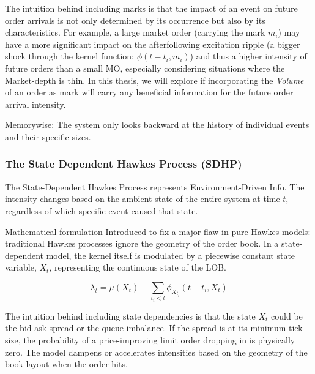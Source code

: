 \documentclass[12pt,a4paper]{cau_thesis}
\begin{document}
The intuition behind including marks is that the impact of an event
on future order arrivals is not only determined by its occurrence but
also by its characteristics. For example, a large market order
(carrying the mark $m_{i}$) may have a more significant impact on the
afterfollowing excitation ripple (a bigger shock through the kernel
function: \(\phi(t-t_{i}, m_{i})\)) and thus a higher intensity of
future orders than a small MO, especially considering situations
where the Market-depth is thin. In this thesis, we will explore if
incorporating the \emph{Volume} of an order as mark will carry any
beneficial information for the future order arrival intensity.

Memorywise: The system only looks backward at the history of
individual events and their specific sizes.
\subsubsection{The State Dependent Hawkes Process (SDHP)}\label{sub_sub_sec:the_state_dependent_hawkes_process}
The State-Dependent Hawkes Process represents Environment-Driven
Info. The intensity changes based on the ambient state of the entire
system at time \(t\), regardless of which specific event caused that
state.

\begin{paragraph}{Mathematical formulation}
    Introduced to fix a major flaw in pure
    Hawkes models: traditional Hawkes processes ignore the geometry of
    the order book. In a state-dependent model, the kernel itself is
    modulated by a piecewise constant state variable, \(X_{t}\),
    representing the continuous state of the LOB.

    \begin{equation}
        \lambda_{t} = \mu(X_{t}) + \sum_{t_{i}<t} \phi_{X_{t_{i}}}(t-t_{i}, X_{t})
    \end{equation}
\end{paragraph}

The intuition behind including state dependencies is that the state
\(X_{t}\) could be the bid-ask spread or the queue imbalance. If the
spread is at its minimum tick size, the probability of a
price-improving limit order dropping in is physically zero. The model
dampens or accelerates intensities based on the geometry of the book
layout when the order hits.
\end{document}
